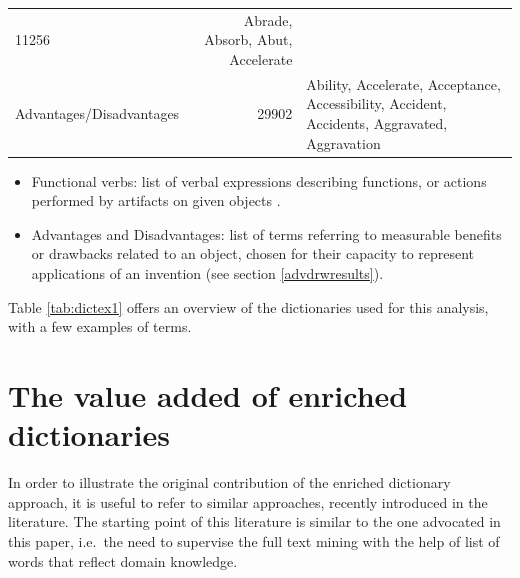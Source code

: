 \documentclass[]{book}
\theoremstyle{definition}
\theoremstyle{definition}
\theoremstyle{definition}
\theoremstyle{remark}
\begin{document}
\begin{longtable}[]{@{}lrl@{}}
\begin{minipage}[t]{0.12\columnwidth}
11256\strut
\end{minipage} & \begin{minipage}[t]{0.62\columnwidth}\raggedright\strut
Abrade, Absorb, Abut, Accelerate\strut
\end{minipage}\tabularnewline
\begin{minipage}[t]{0.17\columnwidth}\raggedright\strut
Advantages/Disadvantages\strut
\end{minipage} & \begin{minipage}[t]{0.12\columnwidth}\raggedleft\strut
29902\strut
\end{minipage} & \begin{minipage}[t]{0.62\columnwidth}\raggedright\strut
Ability, Accelerate, Acceptance, Accessibility, Accident, Accidents,
Aggravated, Aggravation\strut
\end{minipage}\tabularnewline
\bottomrule
\end{longtable}

\begin{itemize}
\item
  Functional verbs: list of verbal expressions describing functions, or
  actions performed by artifacts on given objects
  \citep{fantoni2013automatic, apreda2016functional}.
\item
  Advantages and Disadvantages: list of terms referring to measurable
  benefits or drawbacks related to an object, chosen for their capacity
  to represent applications of an invention (see section
  \ref{advdrwresults}).
\end{itemize}

Table \ref{tab:dictex1} offers an overview of the dictionaries used for
this analysis, with a few examples of terms.

\section{The value added of enriched
dictionaries}\label{the-value-added-of-enriched-dictionaries}

In order to illustrate the original contribution of the enriched
dictionary approach, it is useful to refer to similar approaches,
recently introduced in the literature. The starting point of this
literature is similar to the one advocated in this paper, i.e.~the need
to supervise the full text mining with the help of list of words that
reflect domain knowledge.
\end{document}
